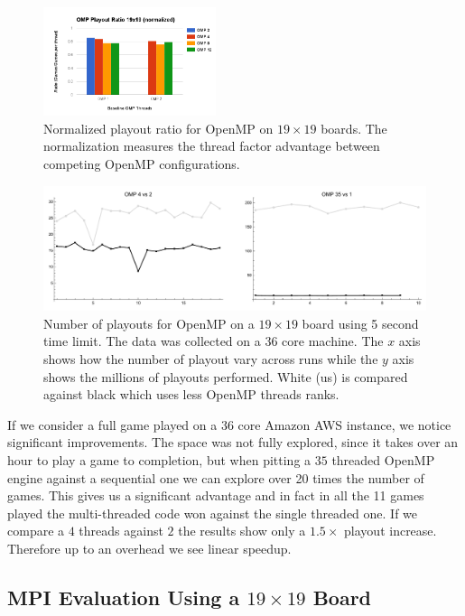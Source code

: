 \documentclass[nocopyrightspace, 10pt]{sigplanconf}
\begin{document}
\begin{figure}
\begin{center}
\includegraphics[width=0.45\textwidth]{omp_19_playout_norm.png}
\end{center}
\caption{Normalized playout ratio for OpenMP on $19 \times 19$ boards. The normalization measures the thread factor advantage between competing OpenMP configurations.}
\label{fig:playoutompfullnorm}
\end{figure}

\begin{figure}
\centering
\includegraphics[width=\textwidth]{adk_19_vs.pdf}
\caption{Number of playouts for OpenMP on a $19\times 19$ board using 5 second time limit. The data was collected on a 36 core machine. The $x$ axis shows how the number of playout vary across runs while the $y$ axis shows the millions of playouts performed. White (us) is compared against black which uses less OpenMP threads ranks.}
\label{fig:playoutomp5limit}
\end{figure}

If we consider a full game played on a 36 core Amazon AWS instance, we notice significant improvements. The space was not fully explored, since it takes over an hour to play a game to completion, but when pitting a $35$ threaded OpenMP engine against a sequential one we can explore over 20 times the number of games. This gives us a significant advantage and in fact in all the 11 games played the multi-threaded code won against the single threaded one. If we compare a $4$ threads against $2$ the results show only a $1.5 \times$ playout increase. Therefore up to an overhead we see linear speedup.

\subsection{MPI Evaluation Using a $19 \times 19$ Board}
\end{document}
